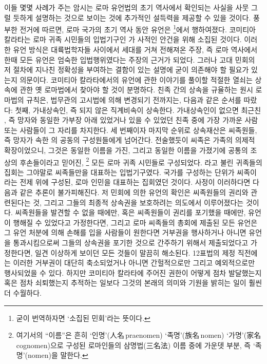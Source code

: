 이들 몇몇 사례가 주는 암시는
로마 유언법의 초기 역사에서 확인되는 사실을 사뭇 그럴 듯하게 설명하는 것으로
보이는 것에 추가적인 설득력을 제공할 수 있을 것이다.
\label{comitiacalata}%
풍부한 전거에 따르면,
로마 국가의 초기 역사 동안 유언은
\footnote{굳이 번역하자면
`소집된 민회'라는 뜻이다.}에서 행하여졌다.
코미티아 칼라타는 로마 귀족 시민들의 입법기구인
가 사적인 안건을 위해 소집된 것이다.
이러한 유언 방식은 대륙법학자들 사이에서 세대를 거쳐 전해져온 주장,
즉 로마 역사에서 한때 모든 유언은 엄숙한 입법행위였다는 주장의
근거가 되었다.
그러나 고대 민회의 저 절차에 지나친 정확성을 부여하는 결함이 있는
설명에 굳이 의존해야 할 필요가 있는지 의문이다.
코미티아 칼라타에서의 유언에 관한 이야기를 풀이할 적절한 열쇠는
상속에 관한 옛 로마법에서 찾아야 할 것이 분명하다.
친족 간의 상속을 규율하는 원시 로마법의 규칙은,
법무관의 고시법에 의해 변경되기 전까지는,
다음과 같은 순서를 따랐다:
첫째, 가내상속인, 즉 되지 않은
직계비속이 상속한다.
가내상속인이 없으면 최근친 ,
즉 망자와 동일한 가부장 아래 있었거나 있을 수 있었던 친족 중에
가장 가까운 사람 또는 사람들이
그 자리를 차지한다.
세 번째이자 마지막 순위로 상속재산은 씨족원들, 즉
망자가 속한 의 공동의 구성원들에게 넘어간다.
전술했듯이 씨족은 가족의 의제적 확장이었으니, 그것은
동일한 이름을 가진,
그리고 동일한 이름을 가졌기에 공통의 조상의 후손들이라고 믿어진,%
\footnote{여기서의 ``이름''은 흔히
  `인명'(人名\,praenomen) `족명'(族名\,nomen) `가명'(家名\,cognomen)으로
  구성된 로마인들의 삼명법(三名法) 이름 중에 가운뎃 부분,
  즉 `족명'(nomen)을 말한다.}
모든 로마 귀족 시민들로 구성되었다.
라고 불린 귀족들의 집회는 그야말로 씨족들만을 대표하는 입법기구였다.
국가를 구성하는 단위가 씨족이라는 전제 위에 구성된,
로마 인민을 대표하는 집회였던 것이다.
사정이 이러하다면 다음과 같은 추론이 불가피해진다.
저 민회에 의한 유언의 확인은 씨족원들의 권리와 관련된다는 것,
그리고 그들의 최종적 상속권을 보호하려는 의도에서 이루어졌다는 것이다.
씨족원들을 발견할 수 없을 때에만,
혹은 씨족원들이 권리를 포기했을 때에만,
유언이 행해질 수 있었다고 가정한다면,
그리고 로마 씨족들의 총회에 제출된 모든 유언은
그 유언 처분에 의해 손해를 입을 사람들이 원한다면 거부권을 행사하거나
아니면 유언을 통과시킴으로써 그들의 상속권을 포기한 것으로 간주하기 위해서
제출되었다고 가정한다면,
일견 이상하게 보이던 모든 것들이 말끔히 해소된다.
12표법의 제정 직전에는 이러한 거부권이 대단히 축소되었거나
아니면 간헐적으로만 그리고 예외적으로만
행사되었을 수 있다.
하지만 코미티아 칼라타에 주어진 권한이 어떻게 점차 발달했는지 혹은
점차 쇠퇴했는지 추적하는 일보다 그것의 본래의 의미와 기원을 밝히는 일이
훨씬 더 수월하다.

